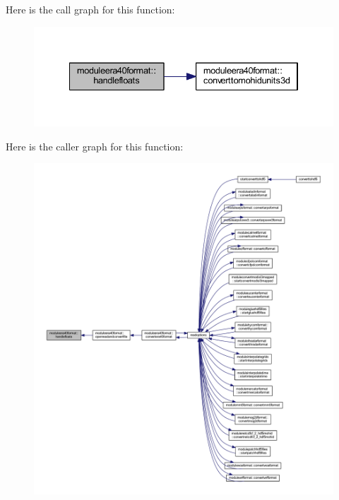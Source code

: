 Here is the call graph for this function\+:\nopagebreak
\begin{figure}[H]
\begin{center}
\leavevmode
\includegraphics[width=334pt]{namespacemoduleera40format_a9389939d144e12060ff692086e9af89e_cgraph}
\end{center}
\end{figure}
Here is the caller graph for this function\+:\nopagebreak
\begin{figure}[H]
\begin{center}
\leavevmode
\includegraphics[width=350pt]{namespacemoduleera40format_a9389939d144e12060ff692086e9af89e_icgraph}
\end{center}
\end{figure}
\mbox{\label{namespacemoduleera40format_a90dfe4450bbbd59c764d529d05f92d76}} 
